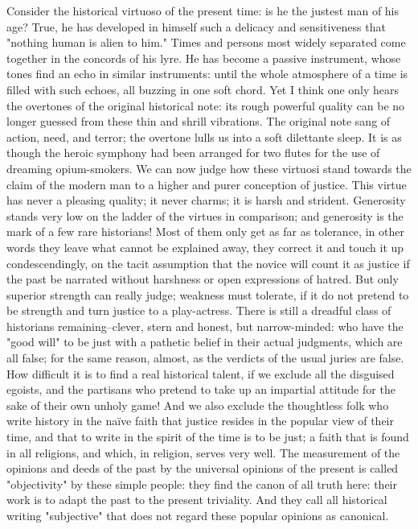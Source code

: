Consider the historical virtuoso of the present time: is he the
justest man of his age? True, he has developed in himself such a
delicacy and sensitiveness that "nothing human is alien to him."
Times and persons most widely separated come together in the concords
of his lyre. He has become a passive instrument, whose tones find an
echo in similar instruments: until the whole atmosphere of a time is
filled with such echoes, all buzzing in one soft chord. Yet I think
one only hears the overtones of the original historical note: its
rough powerful quality can be no longer guessed from these thin and
shrill vibrations. The original note sang of action, need, and
terror; the overtone lulls us into a soft dilettante sleep. It is as
though the heroic symphony had been arranged for two flutes for the
use of dreaming opium-smokers. We can now judge how these virtuosi
stand towards the claim of the modern man to a higher and purer
conception of justice. This virtue has never a pleasing quality; it
never charms; it is harsh and strident. Generosity stands very low on
the ladder of the virtues in comparison; and generosity is the mark
of a few rare historians! Most of them only get as far as tolerance,
in other words they leave what cannot be explained away, they correct
it and touch it up condescendingly, on the tacit assumption that the
novice will count it as justice if the past be narrated without
harshness or open expressions of hatred. But only superior strength
can really judge; weakness must tolerate, if it do not pretend to be
strength and turn justice to a play-actress. There is still a
dreadful class of historians remaining--clever, stern and honest, but
narrow-minded: who have the "good will" to be just with a pathetic
belief in their actual judgments, which are all false; for the same
reason, almost, as the verdicts of the usual juries are false. How
difficult it is to find a real historical talent, if we exclude all
the disguised egoists, and the partisans who pretend to take up an
impartial attitude for the sake of their own unholy game! And we also
exclude the thoughtless folk who write history in the naïve faith
that justice resides in the popular view of their time, and that to
write in the spirit of the time is to be just; a faith that is found
in all religions, and which, in religion, serves very well. The
measurement of the opinions and deeds of the past by the universal
opinions of the present is called "objectivity" by these simple
people: they find the canon of all truth here: their work is to adapt
the past to the present triviality. And they call all historical
writing "subjective" that does not regard these popular opinions as
canonical.

